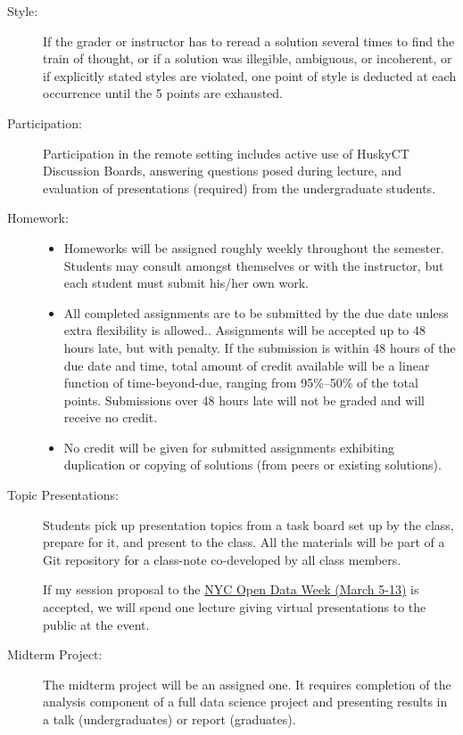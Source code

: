 \documentclass{article}
\begin{document}
\begin{multicols}{2}
\begin{description}
\item[Style:]
  If the grader or instructor has to reread a solution several times
  to find the train of thought, or if a solution was illegible,
  ambiguous, or incoherent, or if explicitly stated styles are
  violated, one point of style is deducted at each occurrence until
  the 5 points are exhausted.

\item[Participation:]  Participation in the remote setting includes
  active use of HuskyCT Discussion Boards, answering questions posed
  during lecture, and evaluation of presentations (required) from the
  undergraduate students.

\item[Homework:]\hspace{0pt}
\begin{itemize}
\item Homeworks will be assigned roughly weekly throughout the
  semester.  Students may consult amongst themselves or with the
  instructor, but each student must submit his/her own work.
  
\item All completed assignments are to be submitted by the due date
  unless extra flexibility is allowed.. 
Assignments will be accepted up to 48 hours late, but with penalty.  If the
submission is within 48 hours of the due date and time, total amount of credit
available will be a linear function of time-beyond-due, ranging from 95\%--50\%
of the total points. Submissions over 48 hours late will not be graded and will
receive no credit.
		
\item No credit will be given for submitted assignments exhibiting
  duplication or copying of solutions (from peers or existing
  solutions).
\end{itemize}

\item[Topic Presentations:]
  Students pick up presentation topics from a task board set up by the
  class, prepare for it, and present to the class. All the materials
  will be part of a Git repository for a class-note co-developed by all class
  members.

  If my session proposal to the \href{https://www.open-data.nyc}{NYC
    Open Data Week (March 5-13)} is accepted, we will spend one lecture
  giving virtual presentations to the public at the event.

\item[Midterm Project:]
  The midterm project will be an assigned one. It requires completion
  of the analysis component of a full data science project
  and presenting results in a talk (undergraduates) or report (graduates).
  

\end{description}
\end{multicols}
\end{document}
